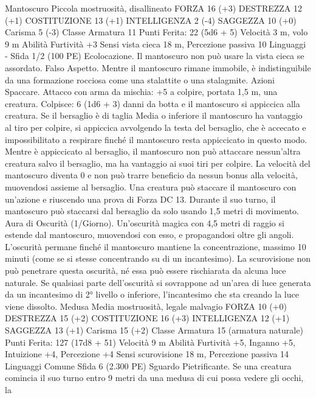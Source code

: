 \begin{multicols}{2}
Mantoscuro
Piccola mostruosità, disallineato
FORZA 16 (+3)
DESTREZZA 12 (+1)
COSTITUZIONE 13 (+1)
INTELLIGENZA 2 (-4)
SAGGEZZA 10 (+0)
Carisma 5 (-3)
Classe Armatura 11
\hspace*{0pt}\hfill{Punti Ferita}: 22 (5d6 + 5)
Velocità 3 m, volo 9 m
Abilità Furtività +3
Sensi vista cieca 18 m, Percezione passiva 10
Linguaggi -
Sfida 1/2 (100 PE)
Ecolocazione. Il mantoscuro non può usare la vista cieca se
assordato.
Falso Aspetto. Mentre il mantoscuro rimane immobile, è
indistinguibile da una formazione rocciosa come una stalattite o
una stalagmite.
Azioni
Spaccare. Attacco con arma da mischia: +5 a colpire, portata 1,5
m, una creatura.
Colpisce: 6 (1d6 + 3) danni da botta e il mantoscuro si appiccica
alla creatura. Se il bersaglio è di taglia Media o inferiore il
mantoscuro ha vantaggio al tiro per colpire, si appiccica avvolgendo
la testa del bersaglio, che è accecato e impossibilitato a respirare
finché il mantoscuro resta appiccicato in questo modo.
Mentre è appiccicato al bersaglio, il mantoscuro non può attaccare
nessun’altra creatura salvo il bersaglio, ma ha vantaggio ai suoi tiri
per colpire. La velocità del mantoscuro diventa 0 e non può trarre
beneficio da nessun bonus alla velocità, muovendosi assieme al
bersaglio.
Una creatura può staccare il mantoscuro con un’azione e riuscendo
una prova di Forza DC 13. Durante il suo turno, il mantoscuro può
staccarsi dal bersaglio da solo usando 1,5 metri di movimento.
Aura di Oscurità (1/Giorno). Un’oscurità magica con 4,5 metri
di raggio si estende dal mantoscuro, muovendosi con esso, e
propagandosi oltre gli angoli. L’oscurità permane finché il
mantoscuro mantiene la concentrazione, massimo 10 minuti
(come se si stesse concentrando su di un incantesimo). La
scurovisione non può penetrare questa oscurità, né essa può
essere rischiarata da alcuna luce naturale. Se qualsiasi parte
dell’oscurità si sovrappone ad un’area di luce generata da un
incantesimo di 2° livello o inferiore, l’incantesimo che sta
creando la luce viene dissolto.
Medusa
Media mostruosità, legale malvagio
FORZA 10 (+0)
DESTREZZA 15 (+2)
COSTITUZIONE 16 (+3)
INTELLIGENZA 12 (+1)
SAGGEZZA 13 (+1)
Carisma 15 (+2)
Classe Armatura 15 (armatura naturale)
\hspace*{0pt}\hfill{Punti Ferita}: 127 (17d8 + 51)
Velocità 9 m
Abilità Furtività +5, Inganno +5, Intuizione +4, Percezione +4
Sensi scurovisione 18 m, Percezione passiva 14
Linguaggi Comune
Sfida 6 (2.300 PE)
Sguardo Pietrificante. Se una creatura comincia il suo turno
entro 9 metri da una medusa di cui possa vedere gli occhi, la

\end{multicols}
